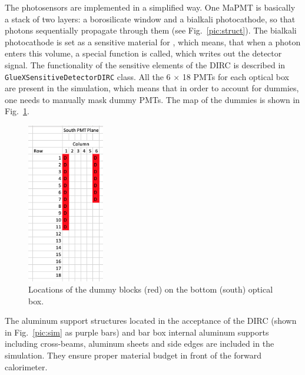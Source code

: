 The photosensors are implemented in a simplified way. One MaPMT is basically a stack of two layers: a borosilicate window and a bialkali photocathode, so that photons sequentially propagate through them (see Fig.~\ref{pic:struct}). The bialkali photocathode is set as a sensitive material for , which means, that when a photon enters this volume, a special function is called, which writes out the detector signal. The functionality of the sensitive elements of the \gluex DIRC is described in \texttt{GlueXSensitiveDetectorDIRC} class. All the 6 $\times$ 18 PMTs for each optical box are present in the simulation, which means that in order to account for dummies, one needs to manually mask dummy PMTs. The map of the dummies is shown in Fig.~\ref{pic:dummies}.

\begin{figure}[!h]
\centering
\includegraphics[width=0.3\textwidth]{pics/dummies.png}
\caption{\label{pic:dummies}
Locations of the dummy blocks (red) on the bottom (south) optical box.
}
\end{figure}

The aluminum support structures located in the acceptance of the DIRC (shown in Fig.~\ref{pic:sim} as purple bars) and bar box internal aluminum supports including cross-beams, aluminum sheets and side edges are included in the simulation. They ensure proper material budget in front of the forward calorimeter.
